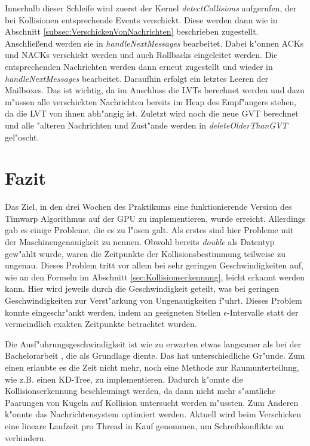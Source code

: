 \documentclass[a4paper, 10pt, openright, parskip, chapterprefix]{scrreprt}
\begin{document}
Innerhalb dieser Schleife wird zuerst der Kernel \emph{detectCollisions} aufgerufen, der bei Kollisionen entsprechende
Events verschickt. Diese werden dann wie in Abschnitt \ref{subsec:VerschickenVonNachrichten} beschrieben zugestellt.
Anschlie\ss end werden sie in \emph{handleNextMessages} bearbeitet. Dabei k"onnen ACKs und NACKs verschickt
werden und auch Rollbacks eingeleitet werden. Die entsprechenden Nachrichten werden dann erneut zugestellt und wieder in
\emph{handleNextMessages} bearbeitet. Daraufhin erfolgt ein letztes Leeren der Mailboxes. Das ist wichtig, da im
Anschluss die LVTs berechnet werden und dazu m"ussen alle verschickten Nachrichten bereits im Heap des Empf"angers
stehen, da die LVT von ihnen abh"angig ist. Zuletzt wird noch die neue GVT berechnet und alle "alteren Nachrichten und
Zust"ande werden in \emph{deleteOlderThanGVT} gel"oscht.


\chapter{Fazit}
Das Ziel, in den drei Wochen des Praktikums eine funktionierende Version des Timwarp Algorithmus auf der GPU zu implementieren,
wurde erreicht. Allerdings gab es einige Probleme, die es zu l"osen galt. Als erstes sind hier Probleme mit der Maschinengenauigkeit zu nennen.
Obwohl bereits \emph{double} als Datentyp gew"ahlt wurde, waren die Zeitpunkte der Kollisionsbestimmung teilweise zu ungenau.
Dieses Problem tritt vor allem bei sehr geringen Geschwindigkeiten auf, wie an den Formeln im Abschnitt \ref{sec:Kollisionserkennung}, leicht
erkannt werden kann. Hier wird jeweils durch die Geschwindigkeit geteilt, was bei geringen Geschwindigkeiten zur Verst"arkung von Ungenauigkeiten
f"uhrt. Dieses Problem konnte eingeschr"ankt werden, indem an geeigneten Stellen $\epsilon$-Intervalle statt der vermeindlich exakten Zeitpunkte betrachtet
wurden.

Die Ausf"uhrungsgeschwindigkeit ist wie zu erwarten etwas langsamer als bei der Bachelorarbeit \cite{bachelor}, die als Grundlage diente. Das hat unterschiedliche 
Gr"unde. Zum einen erlaubte es die Zeit nicht mehr, noch eine Methode zur Raumunterteilung, wie z.B. einen KD-Tree, zu implementieren. Dadurch 
k"onnte die Kollisionserkennung beschleuningt werden, da dann nicht mehr s"amtliche Paarungen von Kugeln auf Kollision untersucht werden m"ussten.
Zum Anderen k"onnte das Nachrichtensystem optimiert werden. Aktuell wird beim Verschicken eine lineare Laufzeit pro Thread in Kauf genommen,
um Schreibkonflikte zu verhindern.
\end{document}
